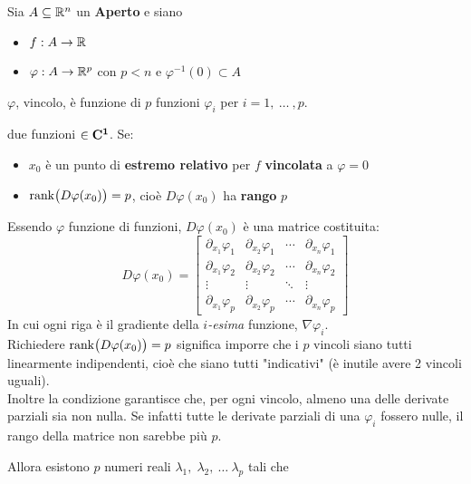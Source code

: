 \begin{theorem}
	\label{teo:molt_lagr_gen}
	Sia $A \subseteq \mathbb{R}^n$ un \textbf{Aperto} e siano
	\begin{itemize}[noitemsep]
		\item $f: A \to \mathbb{R}$
		\item $\varphi: A \to \mathbb{R}^p$ con $p < n$ e $\varphi^{-1}(0) \subset A$
	\end{itemize}
	\begin{note}
		$\varphi$, vincolo, è funzione di $p$ funzioni $\varphi_i$ per $i = 1,\:\dotsc\:,p$.
	\end{note}
	due funzioni $\in \mathbf{C^{1}}$.
	Se:
	\begin{itemize}[noitemsep]
		\item $x_0$ è un punto di \textbf{estremo relativo} per $f$ \textbf{vincolata} a $\varphi = 0$
		\item $\operatorname{rank} \bigl( D\varphi(x_0) \bigr) = p$, cioè $D\varphi(x_0)$ ha \textbf{rango} $p$
	\end{itemize}
	\begin{note}
		\hypertarget{note:teo_molt_lagr_gen}{}
		Essendo $\varphi$ funzione di funzioni, $D\varphi(x_0)$ è una matrice costituita:
		\[
			D\varphi(x_0) =
			\begin{bmatrix}
				\partial_{x_1} \varphi_1 & \partial_{x_2} \varphi_1 & \cdots & \partial_{x_n} \varphi_1\\
				\partial_{x_1} \varphi_2 & \partial_{x_2} \varphi_2 & \cdots & \partial_{x_n} \varphi_2\\
				\vdots & \vdots & \ddots & \vdots\\
				\partial_{x_1} \varphi_p & \partial_{x_2} \varphi_p & \cdots & \partial_{x_n} \varphi_p
			\end{bmatrix}
		\]
		In cui ogni riga è il gradiente della $i$\textit{-esima} funzione, $\nabla \varphi_i$.\\
		Richiedere $\operatorname{rank} \bigl( D\varphi(x_0) \bigr) = p$ significa imporre che i $p$ vincoli siano tutti linearmente indipendenti, cioè che siano tutti "indicativi" (è inutile avere 2 vincoli uguali).\\
		Inoltre la condizione garantisce che, per ogni vincolo, almeno una delle derivate parziali sia non nulla. Se infatti tutte le derivate parziali di una $\varphi_i$ fossero nulle, il rango della matrice non sarebbe più $p$.
	\end{note}
	Allora esistono $p$ numeri reali $\lambda_1,\; \lambda_2,\:\dotsc\:\lambda_p$ tali che
	\begin{equation}

\end{equation}
\end{theorem}
